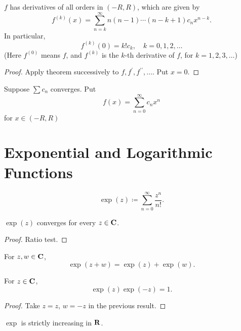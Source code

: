 \begin{corollary}
$f$ has derivatives of all orders in $(-R,R)$, which are given by
\[f^{(k)}(x)=\sum_{n=k}^\infty n(n-1)\cdots(n-k+1)c_nx^{n-k}.\]
In particular,
\[f^{(k)}(0)=k!c_k,\quad k=0,1,2,\dots\]
(Here $f^{(0)}$ means $f$, and $f^{(k)}$ is the $k$-th derivative of $f$, for $k=1,2,3,\dots$)
\end{corollary}

\begin{proof}
Apply theorem successively to $f,f^\prime,f^{\prime\prime},\dots$. Put $x=0$.
\end{proof}

\begin{proposition}
Suppose $\sum c_n$ converges. Put
\[f(x)=\sum_{n=0}^\infty c_n x^n\]
for $x\in(-R,R)$
\end{proposition}

\section{Exponential and Logarithmic Functions}
\begin{definition}
\begin{equation}
\exp(z)\coloneqq\sum_{n=0}^\infty\frac{z^n}{n!}.
\end{equation}
\end{definition}

\begin{proposition}
$\exp(z)$ converges for every $z\in\mathbf C$.
\end{proposition}

\begin{proof}
Ratio test.
\end{proof}

\begin{proposition}
For $z,w\in\mathbf C$,
\[\exp(z+w)=\exp(z)+\exp(w).\]
\end{proposition}

\begin{corollary}
For $z\in\mathbf C$,
\[\exp(z)\exp(-z)=1.\]
\end{corollary}

\begin{proof}
Take $z=z$, $w=-z$ in the previous result.
\end{proof}

\begin{proposition}
$\exp$ is strictly increasing in $\mathbf R$.
\end{proposition}

